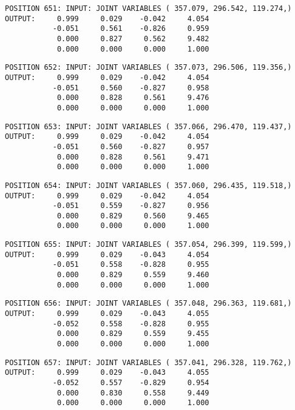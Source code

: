 \begin{verbatim}
POSITION 651: INPUT: JOINT VARIABLES ( 357.079, 296.542, 119.274,)
OUTPUT:     0.999     0.029    -0.042     4.054
           -0.051     0.561    -0.826     0.959
            0.000     0.827     0.562     9.482
            0.000     0.000     0.000     1.000
\end{verbatim} \pagebreak[1]\begin{verbatim}
POSITION 652: INPUT: JOINT VARIABLES ( 357.073, 296.506, 119.356,)
OUTPUT:     0.999     0.029    -0.042     4.054
           -0.051     0.560    -0.827     0.958
            0.000     0.828     0.561     9.476
            0.000     0.000     0.000     1.000
\end{verbatim} \pagebreak[1]\begin{verbatim}
POSITION 653: INPUT: JOINT VARIABLES ( 357.066, 296.470, 119.437,)
OUTPUT:     0.999     0.029    -0.042     4.054
           -0.051     0.560    -0.827     0.957
            0.000     0.828     0.561     9.471
            0.000     0.000     0.000     1.000
\end{verbatim} \pagebreak[1]\begin{verbatim}
POSITION 654: INPUT: JOINT VARIABLES ( 357.060, 296.435, 119.518,)
OUTPUT:     0.999     0.029    -0.042     4.054
           -0.051     0.559    -0.827     0.956
            0.000     0.829     0.560     9.465
            0.000     0.000     0.000     1.000
\end{verbatim} \pagebreak[1]\begin{verbatim}
POSITION 655: INPUT: JOINT VARIABLES ( 357.054, 296.399, 119.599,)
OUTPUT:     0.999     0.029    -0.043     4.054
           -0.051     0.558    -0.828     0.955
            0.000     0.829     0.559     9.460
            0.000     0.000     0.000     1.000
\end{verbatim} \pagebreak[1]\begin{verbatim}
POSITION 656: INPUT: JOINT VARIABLES ( 357.048, 296.363, 119.681,)
OUTPUT:     0.999     0.029    -0.043     4.055
           -0.052     0.558    -0.828     0.955
            0.000     0.829     0.559     9.455
            0.000     0.000     0.000     1.000
\end{verbatim} \pagebreak[1]\begin{verbatim}
POSITION 657: INPUT: JOINT VARIABLES ( 357.041, 296.328, 119.762,)
OUTPUT:     0.999     0.029    -0.043     4.055
           -0.052     0.557    -0.829     0.954
            0.000     0.830     0.558     9.449
            0.000     0.000     0.000     1.000
\end{verbatim} \pagebreak[1]\begin{verbatim}

\end{verbatim}
